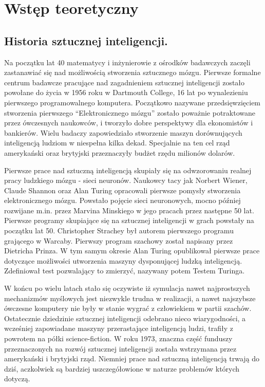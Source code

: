 \section{Wstęp teoretyczny}

\subsection{Historia sztucznej inteligencji.}
\begin{par}
Na początku lat 40 matematycy i inżynierowie z ośrodków badawczych zaczęli zastanawiać się nad możliwością stworzenia sztucznego mózgu.
Pierwsze formalne centrum badawcze pracujące nad zagadnieniem sztucznej inteligencji zostało powołane do życia w 1956 roku w Dartmouth College, 16 lat po wynalezieniu pierwszego programowalnego komputera.
Początkowo nazywane przedsięwzięciem stworzenia pierwszego ``Elektronicznego mózgu'' zostało poważnie potraktowane przez ówczesnych naukowców, i tworzyło dobre perspektywy dla ekonomistów i bankierów.
Wielu badaczy zapowiedziało stworzenie maszyn dorównujących inteligencją ludziom w niespełna kilka dekad.
Specjalnie na ten cel rząd amerykański oraz brytyjski przeznaczyły budżet rzędu milionów dolarów.
\end{par}
\begin{par}
Pierwsze prace nad sztuczną inteligencją skupiały się na odwzorowaniu realnej pracy ludzkiego mózgu - sieci neuronów.
Naukowcy tacy jak Norbert Wiener, Claude Shannon oraz Alan Turing opracowali pierwsze pomysły stworzenia elektronicznego mózgu.
Powstało pojęcie sieci neuronowych, mocno później rozwijane m.in. przez Marvina Minskiego w jego pracach przez następne 50 lat.
Pierwsze programy skupiające się na sztucznej inteligencji w grach powstały na początku lat 50. Christopher Strachey był autorem pierwszego programu grającego w Warcaby.
Pierwszy program szachowy został napisany przez Dietricha Prinza.
W tym samym okresie Alan Turing opublikował pierwsze prace dotyczące możliwości utworzenia maszyny dysponującej ludzką inteligencją.
Zdefiniował test pozwalający to zmierzyć, nazywany potem Testem Turinga.
\end{par}
\begin{par}
W końcu po wielu latach stało się oczywiste iż symulacja nawet najprostszych mechanizmów myślowych jest niezwykle trudna w realizacji, a nawet najszybsze ówczesne komputery nie były w stanie wygrać z człowiekiem w partii szachów. 
Ostatecznie dziedzinie sztucznej inteligencji odebrano nieco wiarygodności, a wcześniej zapowiadane maszyny przerastające inteligencją ludzi, trafiły z powrotem na półki science-fiction. W roku 1973, znaczna część funduszy przeznaczonych na rozwój sztucznej inteligencji została wstrzymana przez amerykański i brytyjski rząd.
Niemniej prace nad sztuczną inteligencją trwają do dziś, aczkolwiek są bardziej uszczegółowione w naturze problemów których dotyczą.
\end{par}


